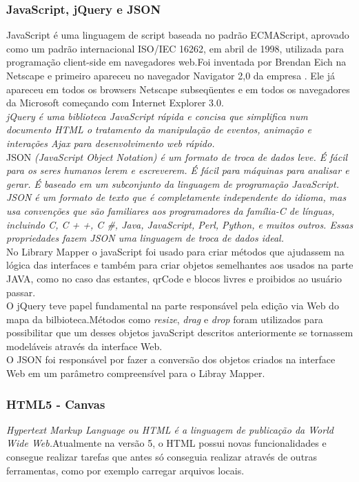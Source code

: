 \documentclass[a4paper,10pt]{article}
\begin{document}
	\subsubsection{JavaScript, jQuery e JSON}
	 JavaScript é uma linguagem de script baseada no padrão ECMAScript, aprovado como um padrão internacional ISO/IEC 16262, em abril de 1998,
	 utilizada para programação client-side em navegadores web.Foi inventada por Brendan Eich na Netscape e primeiro
	apareceu no navegador Navigator 2,0 da empresa . Ele já apareceu em todos os browsers Netscape subseqüentes e em todos os navegadores da Microsoft começando com Internet Explorer 
	3.0.\cite{javascript}\\

	{\it jQuery é uma biblioteca JavaScript rápida e concisa que simplifica num documento HTML o tratamento da manipulação de eventos, animação
	 e interações Ajax para desenvolvimento web rápido.}\cite{jquery} \\
	
	JSON {\it (JavaScript Object Notation) é um formato de troca de dados leve. É fácil para os seres humanos
	 lerem e escreverem. É fácil para máquinas para analisar e gerar. É baseado em um subconjunto da linguagem de programação
	 JavaScript. JSON é um formato de texto que é completamente independente
	 do idioma, mas usa convenções que são familiares aos programadores da família-C de línguas, incluindo C, C + +, C \#, Java,
	 JavaScript, Perl, Python, e muitos outros. Essas propriedades fazem JSON uma linguagem de troca de dados ideal.}\cite{JSON}\\


	No Library Mapper o javaScript foi usado para criar métodos que ajudassem na lógica das interfaces e também para criar objetos
	semelhantes aos usados na parte JAVA, como no caso das estantes, qrCode e blocos livres e proibidos ao usuário passar.\\
	 
	O jQuery teve papel fundamental na parte responsável pela edição via Web do mapa da bilbioteca.Métodos como {\it resize}, {\it drag} e {\it drop}
	foram utilizados para possibilitar que um desses objetos javaScript descritos anteriormente se tornassem modeláveis através da interface Web.\\     

	O JSON foi responsável por fazer a conversão dos objetos criados na interface Web em um parâmetro compreensível para o Libray Mapper.
	\subsubsection{HTML5 - Canvas}
	{\it Hypertext Markup Language ou HTML é a linguagem de publicação da World Wide Web.}\cite{html}Atualmente na versão 5, o HTML
	possui novas funcionalidades e consegue realizar tarefas que antes só conseguia realizar através de outras ferramentas, como por exemplo
	carregar arquivos locais.\\
\end{document}
